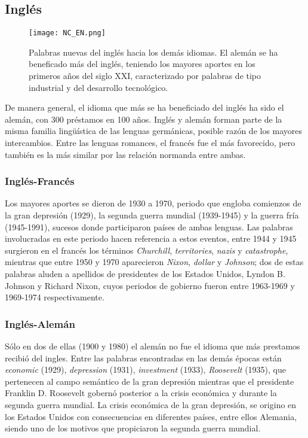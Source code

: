
\subsection{Inglés} %

\begin{figure} %
	\centering
	\texttt{[image: NC\_EN.png]}
	\label{fig.NC_EN}
	\caption{Palabras nuevas del inglés hacia los demás idiomas. El alemán se ha beneficado más del inglés, teniendo los mayores aportes en los primeros años del siglo XXI, caracterizado por palabras de tipo industrial y del desarrollo tecnológico.}
\end{figure} %

De manera general, el idioma que más se ha beneficiado del inglés ha sido el
alemán, con 300 préstamos en 100 años.  Inglés y alemán forman parte de la
misma familia lingüística de las lenguas germánicas,  posible razón de los
mayores intercambios. Entre las lenguas romances, el francés fue el más
favorecido, pero también es la más similar por las relación normanda entre
ambas.

\subsubsection*{Inglés-Francés} %

Los mayores aportes se dieron de 1930 a 1970, periodo que engloba comienzos de
la gran depresión (1929), la segunda guerra mundial (1939-1945) y la guerra fría (1945-1991), sucesos donde
participaron países de ambas lenguas. Las palabras involucradas en este periodo
hacen referencia a estos eventos, entre 1944 y 1945 surgieron en el francés los
términos \textit{Churchill}, \textit{territories}, \textit{nazis} y
\textit{catastrophe},  mientras que  entre 1950 y 1970
aparecieron \textit{Nixon}, \textit{dollar} y \textit{Johnson}; dos de estas
palabras aluden a apellidos de presidentes de los Estados Unidos,  Lyndon B.
Johnson y Richard Nixon, cuyos periodos de gobierno fueron  entre 1963-1969 y
1969-1974 respectivamente.
\subsubsection*{Inglés-Alemán} %
Sólo  en dos de ellas (1900  y 1980) el alemán no fue el idioma que más prestamos recibió  del ingles. Entre las palabras encontradas
en las demás épocas están \textit{economic} (1929), \textit{depression} (1931),
\textit{investment} (1933), \textit{Roosevelt} (1935), que pertenecen al campo
semántico de la gran depresión mientras que el presidente Franklin D. Roosevelt
gobernó posterior a la crisis económica y durante la segunda guerra mundial. La crisis económica de la gran depresión, se origino en los Estados Unidos con consecuencias en diferentes países, entre ellos  Alemania, siendo uno de los motivos que propiciaron la segunda guerra mundial.

